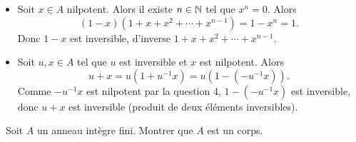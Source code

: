 {\begin{td-sol}[]
\begin{enumerate}
\begin{itemize}[\ptr{}]
                \item Soit \(x\in A\) nilpotent. Alors il existe \(n\in\mathbb{N}\) tel que \(x^n = 0\).
                Alors
                \begin{equation*}
                    (1-x)(1+x+x^2+\cdots+x^{n-1}) = 1-x^n = 1.
                \end{equation*}
                Donc \(1-x\) est inversible, d'inverse \(1+x+x^2+\cdots+x^{n-1}\).

                \item Soit \(u,x\in A\) tel que \(u\) est inversible et \(x\) est nilpotent.
                Alors
                \begin{equation*}
                    u+x = u(1 + u^{-1}x) = u(1-(-u^{-1}x)).
                \end{equation*}
                Comme \(-u^{-1}x\) est nilpotent par la question 4, \(1-(-u^{-1}x)\) est inversible,
                donc \(u+x\) est inversible (produit de deux éléments inversibles).
            \end{itemize}
        \end{enumerate}
    \end{td-sol}
}{}


\begin{td-exo}\, %
    Soit \(A\) un anneau intègre fini. Montrer que \(A\) est un corps.
\end{td-exo}

